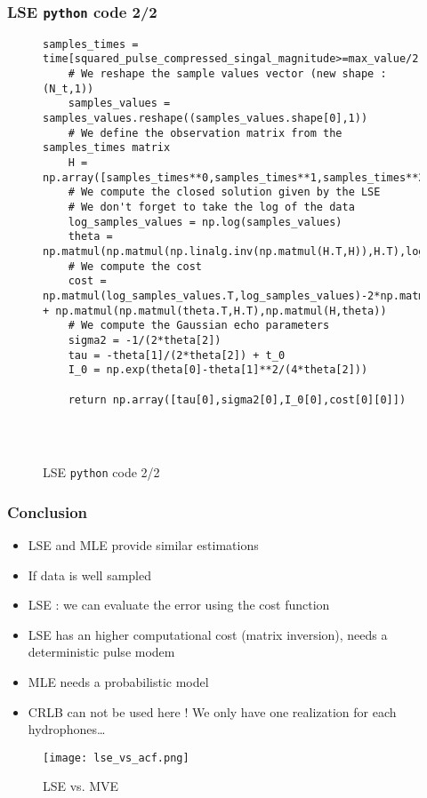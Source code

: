 \documentclass[UKenglish,8pt,aspectratio=1610]{beamer}
\begin{document}
\begin{frame}[fragile]
	\frametitle{LSE \texttt{python} code 2/2}
	\begin{figure}
		\begin{lstlisting}[language=PythonPlus,style=colorEX]
	samples_times = time[squared_pulse_compressed_singal_magnitude>=max_value/2]
	# We reshape the sample values vector (new shape : (N_t,1))
	samples_values = samples_values.reshape((samples_values.shape[0],1))
	# We define the observation matrix from the samples_times matrix
	H = np.array([samples_times**0,samples_times**1,samples_times**2]).T
	# We compute the closed solution given by the LSE 
	# We don't forget to take the log of the data
	log_samples_values = np.log(samples_values)
	theta = np.matmul(np.matmul(np.linalg.inv(np.matmul(H.T,H)),H.T),log_samples_values)
	# We compute the cost 
	cost = np.matmul(log_samples_values.T,log_samples_values)-2*np.matmul(log_samples_values.T,np.matmul(H,theta)) + np.matmul(np.matmul(theta.T,H.T),np.matmul(H,theta))
	# We compute the Gaussian echo parameters
	sigma2 = -1/(2*theta[2])
	tau = -theta[1]/(2*theta[2]) + t_0
	I_0 = np.exp(theta[0]-theta[1]**2/(4*theta[2]))
	
	return np.array([tau[0],sigma2[0],I_0[0],cost[0][0]])
	
			
			
		\end{lstlisting}
		\caption{LSE \texttt{python} code 2/2}
	\end{figure}
\end{frame}
\begin{frame}
	\frametitle{Conclusion}
			\begin{itemize}
			\item LSE and MLE provide similar estimations
			\item If data is well sampled
			\item LSE : we can evaluate the error using the cost function
			\item LSE has an higher computational cost (matrix inversion), needs a deterministic pulse modem
			\item MLE needs a probabilistic model
			\item CRLB can not be used here ! We only have one realization for each hydrophones\dots
		\end{itemize}
			\begin{figure}[h!]
				\texttt{[image: lse\_vs\_acf.png]}
				\centering
				\caption{LSE vs. MVE}
			\end{figure}
	
\end{frame}
\end{document}
